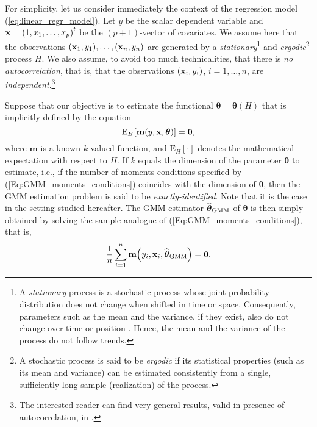 For simplicity, let us consider immediately the context of the regression
model (\ref{eq:linear_regr_model}). Let $y$ be the scalar dependent variable
and $\stvec{x}=\left(  1,x_{1},\ldots,x_{p}\right)  ^{t}$ be the $\left(
p+1\right)  $-vector of covariates. We assume here that the observations
$\left(  \stvec{x}_{1},y_{1}\right)  ,\ldots,\left(  \stvec{x}_{n}%
,y_{n}\right)  $ are generated by a \emph{stationary}\footnote{A
\emph{stationary} process is a stochastic process whose joint probability
distribution does not change when shifted in time or space. Consequently,
parameters such as the mean and the variance, if they exist, also do not
change over time or position . Hence, the mean and the variance of the process
do not follow trends.} and \emph{ergodic}\footnote{A stochastic process is
said to be \emph{ergodic} if its statistical properties (such as its mean
and variance) can be estimated consistently from a single, sufficiently long
sample (realization) of the process.} process $H$. We also assume, to avoid
too much technicalities, that there is \emph{no autocorrelation}, that is,
that the observations $\left(  \stvec{x}_{i},y_{i}\right)  $, $i = 1, \dots, n$,
are \emph{independent}.\footnote{The interested reader can find very general
results, valid in presence of autocorrelation, in
\cite{Croux:2003}.}

Suppose that our objective is to estimate the functional $\boldsymbol{\theta
}=\boldsymbol{\theta}\left(  H\right)  $ that is implicitly defined by the
equation
\begin{equation}
\mathrm{E}_{H}\left[  \mathbf{m}\left(  y,\stvec{x},\boldsymbol{\theta
}\right)  \right]  =\stvec{0}, \label{Eq:GMM_moments_conditions}%
\end{equation}
where $\mathbf{m}$ is a known $k$-valued function, and $\mathrm{E}_{H}\left[
\cdot\right]  $ denotes the mathematical expectation with respect to $H$. If
$k$ equals the dimension of the parameter $\boldsymbol{\theta}$ to estimate,
i.e., if the number of moments conditions specified by
(\ref{Eq:GMM_moments_conditions}) co\"{\i}ncides with the dimension of
$\boldsymbol{\theta}$, then the GMM estimation problem is said to be
\emph{exactly-identified}. Note that it is the case in the setting studied
hereafter. The GMM estimator $\widehat{\boldsymbol{\theta}}_{\mathrm{GMM}}$ of
$\boldsymbol{\theta}$ is then simply obtained by solving the sample analogue
of (\ref{Eq:GMM_moments_conditions}), that is,
\begin{equation}
\frac{1}{n}\sum_{i=1}^{n}\mathbf{m}\left(  y_{i},\stvec{x}_{i},\widehat
{\boldsymbol{\theta}}_{\mathrm{GMM}}\right)  =\stvec{0}.
\label{Eq:GMM_equations}%
\end{equation}


